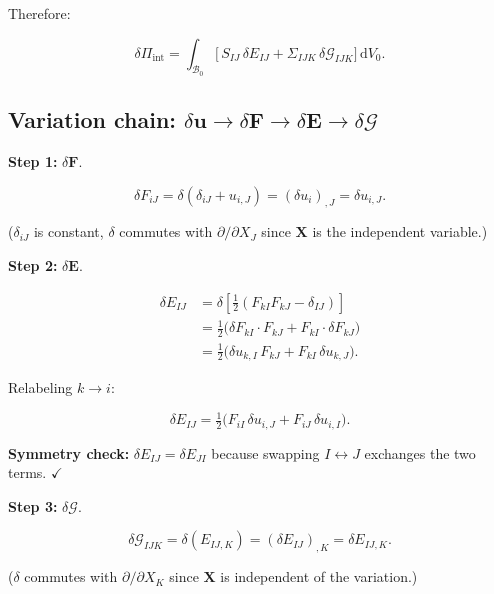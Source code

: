\documentclass[11pt]{article}
\newcommand{\bX}{\mathbf{X}}
\newcommand{\bu}{\mathbf{u}}
\newcommand{\bF}{\mathbf{F}}
\newcommand{\bE}{\mathbf{E}}
\newcommand{\bX}{\mathbf{X}}
\newcommand{\bu}{\mathbf{u}}
\newcommand{\bF}{\mathbf{F}}
\newcommand{\bE}{\mathbf{E}}
\begin{document}
Therefore:

\begin{equation}
\boxed{
\delta\Pi_{\mathrm{int}}
= \int_{\mathcal{B}_{0}}
  \bigl[\,S_{IJ}\,\delta E_{IJ}
        + \Sigma_{IJK}\,\delta\mathcal{G}_{IJK}\bigr]\,
  \mathrm{d}V_{0}.
}
\end{equation}

\subsection{Variation chain: $\delta\bu \to \delta\bF \to \delta\bE \to \delta\bm{\mathcal{G}}$}

\textbf{Step 1:} $\delta\bF$.

\begin{equation}
\delta F_{iJ}
= \delta(\delta_{iJ}+u_{i,J})
= (\delta u_{i})_{,J}
= \delta u_{i,J}.
\end{equation}

($\delta_{iJ}$ is constant, $\delta$ commutes with $\partial/\partial X_J$
since $\bX$ is the independent variable.)

\textbf{Step 2:} $\delta\bE$.

\begin{align}
\delta E_{IJ}
&= \delta\!\left[\tfrac12(F_{kI}F_{kJ}-\delta_{IJ})\right]
\nonumber\\
&= \tfrac12\bigl(\delta F_{kI}\cdot F_{kJ}
              + F_{kI}\cdot\delta F_{kJ}\bigr)
\nonumber\\
&= \tfrac12\bigl(\delta u_{k,I}\,F_{kJ}
              + F_{kI}\,\delta u_{k,J}\bigr).
\end{align}

Relabeling $k\to i$:

\begin{equation}
\delta E_{IJ}
= \tfrac12\bigl(F_{iI}\,\delta u_{i,J}
              + F_{iJ}\,\delta u_{i,I}\bigr).
\end{equation}

\textbf{Symmetry check:} $\delta E_{IJ}=\delta E_{JI}$ because
swapping $I\leftrightarrow J$ exchanges the two terms. $\checkmark$

\textbf{Step 3:} $\delta\bm{\mathcal{G}}$.

\begin{equation}
\delta\mathcal{G}_{IJK}
= \delta(E_{IJ,K})
= (\delta E_{IJ})_{,K}
= \delta E_{IJ,K}.
\end{equation}

($\delta$ commutes with $\partial/\partial X_K$ since $\bX$ is
independent of the variation.)
\end{document}
